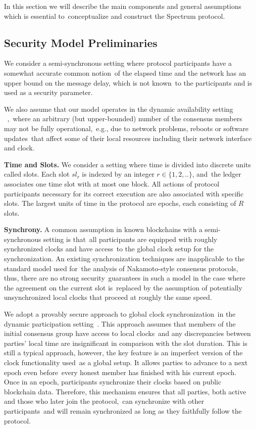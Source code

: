In this section we will describe the main components and general assumptions which is essential to\
conceptualize and construct the Spectrum protocol.

\subsection{Security Model Preliminaries}\label{subsec:security-model-preliminaries.}
We consider a semi-synchronous setting where protocol participants have a somewhat accurate common notion\
of the elapsed time and the network has an upper bound on the message delay, which is not known\
to the participants and is used as a security parameter.

We also assume that our model operates in the dynamic availability setting ~\cite{Badertscher2018},\
where an arbitrary (but upper-bounded) number of the consensus members may not be fully operational,\
e.g., due to network problems, reboots or software updates\
that affect some of their local resources including their network interface and clock.

\textbf{Time and Slots.}
We consider a setting where time is divided into discrete units called slots.
Each slot $sl_r$ is indexed by an integer $r \in \{1, 2, ..\}$, and\
the ledger associates one time slot with at most one block.
All actions of protocol participants necessary for its correct execution are also associated with specific slots.
The largest units of time in the protocol are epochs, each consisting of $R$ slots.

\textbf{Synchrony.}
A common assumption in known blockchains with a semi-synchronous setting is that\
all participants are equipped with roughly synchronized clocks and have access\
to the global clock setup for the synchronization.
An existing synchronization techniques are inapplicable to the standard model used for\
the analysis of Nakamoto-style consensus protocols, thus, there are no strong security\
guarantees in such a model in the case where the agreement on the current slot is\
replaced by the assumption of potentially unsynchronized local clocks that proceed at roughly the same speed.

We adopt a provably secure approach to global clock synchronization\
in the dynamic participation setting~\cite{cryptoeprint:2019/838}.
This approach assumes that members of the initial consensus group have access to local clocks\
and any discrepancies between parties' local time are insignificant in comparison with the slot duration.
This is still a typical approach, however, the key feature is an imperfect version of the clock functionality used\
as a global setup.
It allows parties to advance to a next epoch even before\
every honest member has finished with his current epoch.
Once in an epoch, participants synchronize their clocks based on public blockchain data.
Therefore, this mechanism ensures that all parties, both active and those who later join the protocol,\
can synchronize with other participants\
and will remain synchronized as long as they faithfully follow the protocol.

